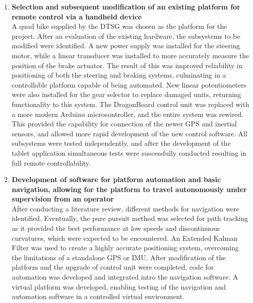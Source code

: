 \documentclass[main.tex]{subfiles}
\begin{document}
\begin{enumerate}
\item \textbf{Selection and subsequent modification of an existing platform for remote control via a handheld device}\\ 
A quad bike supplied by the DTSG was chosen as the platform for the project. 
After an evaluation of the existing hardware, the subsystems to be modified were identified. 
A new power supply was installed for the steering motor, while a linear transducer was installed to more accurately measure the position of the brake actuator. 
The result of this was improved reliability in positioning of both the steering and braking systems, culminating in a controllable platform capable of being automated.
New linear potentiometers were also installed for the gear selector to replace damaged units, returning functionality to this system. 
The DragonBoard control unit was replaced with a more modern Arduino microcontroller, and the entire system was rewired. 
This provided the capability for connection of the newer GPS and inertial sensors, and allowed more rapid development of the new control software.
All subsystems were tested independently, and after the development of the tablet application simultaneous tests were successfully conducted resulting in full remote controllability.

 

\item \textbf{Development of software for platform automation and basic navigation, allowing for the platform to travel autonomously under supervision from an operator}\\ 
After conducting a literature review, different methods for navigation were identified. Eventually, the pure pursuit method was selected for path tracking as it provided the best performance at low speeds and discontinuous curvatures, which were expected to be encountered. An Extended Kalman Filter was used to create a highly accurate positioning system, overcoming the limitations of a standalone GPS or IMU. After modification of the platform and the upgrade of control unit were completed, code for automation was developed and integrated intro the navigation software. A virtual platform was developed, enabling testing of the navigation and automation software in a controlled virtual environment. 


\end{enumerate}
\end{document}
